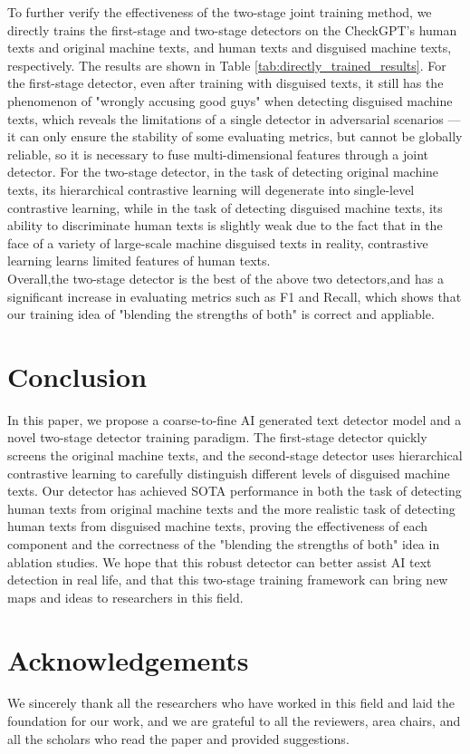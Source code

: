\documentclass[11pt]{article}
\begin{document}
		
			To further verify the effectiveness of the two-stage joint training method, we directly trains the first-stage and two-stage detectors on the CheckGPT's human texts and original machine texts, and human texts and disguised machine texts, respectively. The results are shown in Table \ref{tab:directly_trained_results}. For the first-stage detector, even after training with disguised texts, it still has the phenomenon of "wrongly accusing good guys" when detecting disguised machine texts, which reveals the limitations of a single detector in adversarial scenarios --- it can only ensure the stability of some evaluating metrics, but cannot be globally reliable, so it is necessary to fuse multi-dimensional features through a joint detector. For the two-stage detector, in the task of detecting original machine texts, its hierarchical contrastive learning will degenerate into single-level contrastive learning, while in the task of detecting disguised machine texts, its ability to discriminate human texts is slightly weak due to the fact that in the face of a variety of large-scale machine disguised texts in reality, contrastive learning learns limited features of human texts.\\
			Overall,the two-stage detector is the best of the above two detectors,and has a significant increase in evaluating metrics such as F1 and Recall, which shows that our training idea of "blending the strengths of both" is correct and appliable.
			
	\section{Conclusion}
	In this paper, we propose a coarse-to-fine AI generated text detector model and a novel two-stage detector training paradigm. The first-stage detector quickly screens the original machine texts, and the second-stage detector uses hierarchical contrastive learning to carefully distinguish different levels of disguised machine texts. Our detector has achieved SOTA performance in both the task of detecting human texts from original machine texts and the more realistic task of detecting human texts from disguised machine texts, proving the effectiveness of each component and the correctness of the "blending the strengths of both" idea in ablation studies. We hope that this robust detector can better assist AI text detection in real life, and that this two-stage training framework can bring new maps and ideas to researchers in this field.
	
	
	\section{Acknowledgements}
	We sincerely thank all the researchers who have worked in this field and laid the foundation for our work, and we are grateful to all the reviewers, area chairs, and all the scholars who read the paper and provided suggestions.
\end{document}
